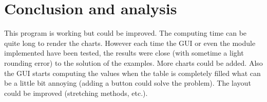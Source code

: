 \documentclass[english, 12 pt, openany, oneside]{book}
\begin{document}
\chapter*{Conclusion and analysis}

This program is working but could be improved. The computing time can be quite long to render the charts. However each time the GUI or even the module implemented have been tested, the results were close (with sometime a light rounding error) to the solution of the examples. More charts could be added. Also the GUI starts computing the values when the table is completely filled what can be a little bit annoying (adding a  button could solve the problem). The layout could be improved (stretching methods, etc.).

\end{document}

